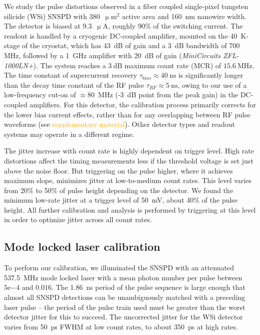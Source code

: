 \documentclass[11pt]{caltech_thesis} %
\begin{document}
We study the pulse distortions observed in a fiber coupled single-pixel
tungsten silicide (WSi) SNSPD with
380~$\mathrm{\upmu m^2}$ active area and
160~nm nanowire width. The detector is biased at
9.3~$\mathrm{\upmu A}$, roughly 90\% of the switching
current. The readout is handled by a cryogenic DC-coupled amplifier,
mounted on the 40~K-stage of the cryostat, which has
43~dB of gain and a 3~dB bandwidth of 700
MHz, followed by a 1~GHz amplifier with
20~dB of gain (\emph{MiniCircuits ZFL-1000LN+}). The
system reaches a $3~\mathrm{dB}$ maximum count rate (MCR) of
$15.6~\mathrm{MHz}$. The time constant of supercurrent recovery
$\tau_{bias} \approx 40~\mathrm{ns}$ is significantly longer than the
decay time constant of the RF pulse $\tau_{RF} \approx 5~\mathrm{ns}$,
owing to our use of a low-frequency cut-on of
$\approx 80$~MHz (-3~dB point from the
peak gain) in the DC-coupled amplifiers. For this detector, the
calibration process primarily corrects for the lower bias current
effects, rather than for any overlapping between RF pulse waveforms (see
\textcolor{orange}{supplementary material}). Other detector types and
readout systems may operate in a different regime.

The jitter increase with count rate is highly dependent on trigger
level. High rate distortions affect the timing measurements less if the
threshold voltage is set just above the noise floor. But triggering on
the pulse higher, where it achieves maximum slope, minimizes jitter at
low-to-medium count rates. This level varies from 20\% to 50\% of pulse
height depending on the detector. We found the minimum low-rate jitter
at a trigger level of 50~mV, about 40\% of the pulse
height. All further calibration and analysis is performed by triggering
at this level in order to optimize jitter across all count rates.

\hypertarget{mode-locked-laser-calibration}{%
\subsection{Mode locked laser
calibration}\label{mode-locked-laser-calibration}}

To perform our calibration, we illuminated the SNSPD with an attenuated
537.5~MHz mode locked laser with a mean photon number per
pulse between $5\mathrm{e}{-4}$ and $0.016$. The 1.86~ns
period of the pulse sequence is large enough that almost all SNSPD
detections can be unambiguously matched with a preceding laser pulse --
the period of the pulse train used must be greater than the worst
detector jitter for this to succeed. The uncorrected jitter for the WSi
detector varies from 50~ps FWHM at low count rates, to
about 350~ps at high rates.
\end{document}

